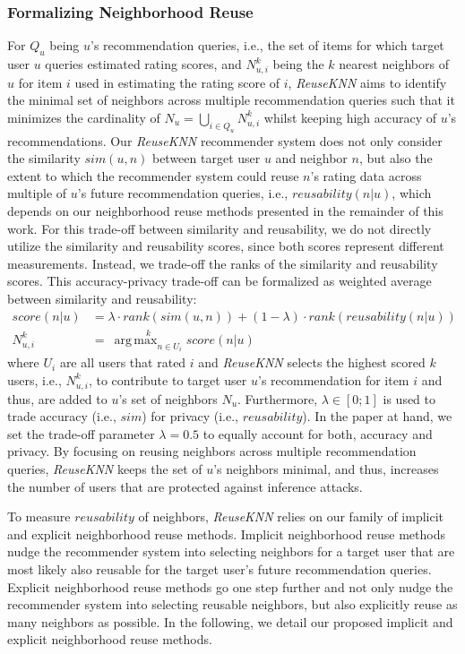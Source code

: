 \documentclass[manuscript,review,anonymous]{acmart}
\DeclareMathOperator*{\argmax}{arg\,max}
\begin{document}
\subsubsection{Formalizing Neighborhood Reuse} 
For $Q_u$ being $u$'s recommendation queries, i.e., the set of items for which target user $u$ queries estimated rating scores, and $N^k_{u, i}$ being the $k$ nearest neighbors of $u$ for item $i$ used in estimating the rating score of $i$, \emph{ReuseKNN} aims to identify the minimal set of neighbors across multiple recommendation queries such that it minimizes the cardinality of $N_u = \bigcup_{i \in Q_u} N^k_{u, i}$
whilst keeping high accuracy of $u$'s recommendations.
Our \emph{ReuseKNN} recommender system does not only consider the similarity $sim(u, n)$ between target user $u$ and neighbor $n$, but also the extent to which the recommender system could reuse $n$'s rating data across multiple of $u$'s future recommendation queries, i.e., $reusability(n|u)$, which depends on our neighborhood reuse methods presented in the remainder of this work.
For this trade-off between similarity and reusability, we do not directly utilize the similarity and reusability scores, since both scores represent different measurements.
Instead, we trade-off the ranks of the similarity and reusability scores.
This accuracy-privacy trade-off can be formalized as weighted average between similarity and reusability:
\begin{align}
    \label{eq:tradeoff}
    score(n|u) &= \lambda \cdot rank(sim(u, n)) + (1 - \lambda) \cdot rank(reusability(n|u)) \\
    N^k_{u, i} &=\ \stackrel{k}{\argmax_{n \in U_i}} score(n|u)
\end{align}
where $U_i$ are all users that rated $i$ and \emph{ReuseKNN} selects the highest scored $k$ users, i.e., $N^k_{u, i}$, to contribute to target user $u$'s recommendation for item $i$ and thus, are added to $u$'s set of neighbors $N_u$.
Furthermore, $\lambda \in [0; 1]$ is used to trade accuracy (i.e., $sim$) for privacy (i.e., $reusability$).
In the paper at hand, we set the trade-off parameter $\lambda=0.5$ to equally account for both, accuracy and privacy.
By focusing on reusing neighbors across multiple recommendation queries, \emph{ReuseKNN} keeps the set of $u$'s neighbors minimal, and thus, increases the number of users that are protected against inference attacks.

To measure $reusability$ of neighbors, \emph{ReuseKNN} relies on our family of implicit and explicit neighborhood reuse methods.
Implicit neighborhood reuse methods nudge the recommender system into selecting neighbors for a target user that are most likely also reusable for the target user's future recommendation queries.
Explicit neighborhood reuse methods go one step further and not only nudge the recommender system into selecting reusable neighbors, but also explicitly reuse as many neighbors as possible.
In the following, we detail our proposed implicit and explicit neighborhood reuse methods.
\end{document}
